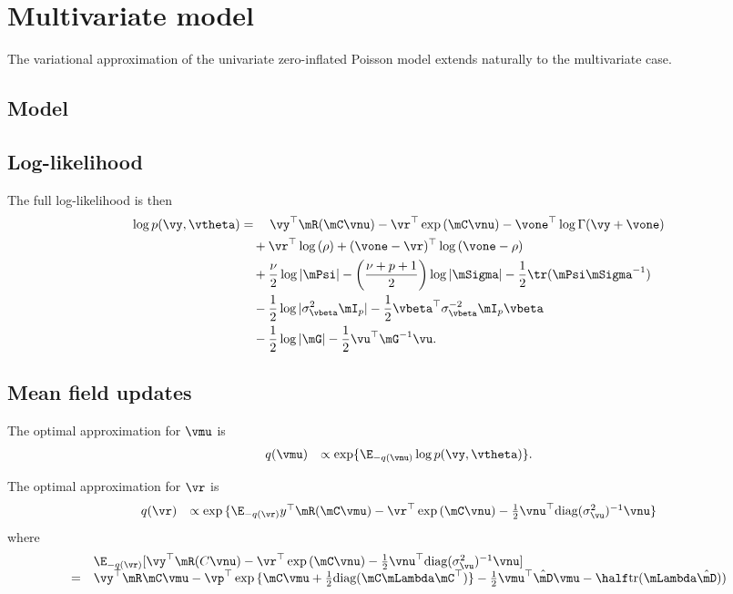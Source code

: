 \section{Multivariate model}

The variational approximation of the univariate zero-inflated Poisson model extends naturally to the
multivariate case.

\subsection{Model}

\subsection{Log-likelihood}
The full log-likelihood is then
\begin{align*}
	\log p(\vy, \vtheta) & = \quad \vy^\top \mR(\mC \vnu) - \vr^\top \exp{(\mC \vnu)} - \vone^\top \log \Gamma(\vy + \vone)                                 \\
	                     & \quad + \vr^\top \log{(\rho)} + (\vone - \vr)^\top \log{(\vone - \rho)}                                                          \\
	                     & \quad + \frac{\nu}{2} \log |\mPsi| - \left( \frac{\nu + p + 1}{2} \right) \log{|\mSigma|} - \frac{1}{2} \tr (\mPsi \mSigma^{-1}) \\
	                     & \quad - \frac{1}{2} \log{|\sigma^2_\vbeta \mI_p|} - \frac{1}{2} \vbeta^\top \sigma_\vbeta^{-2} \mI_p \vbeta                      \\
	                     & \quad - \frac{1}{2} \log |\mG| - \frac{1}{2} \vu^\top \mG^{-1} \vu.                                                                
\end{align*}

\subsection{Mean field updates}
The optimal approximation for $\vmu$ is
\[
	\begin{array}{rl}
		q(\vmu) & \propto \exp \{ \E_{-q(\vnu)} \log p(\vy, \vtheta) \}.
	\end{array}
\]

\noindent The optimal approximation for $\vr$ is
\[
	\begin{array}{rl}
		q(\vr) & \propto \exp{\{\E_{-q(\vr)}y^\top\mR(\mC\vmu) - \vr^\top\exp{(\mC\vnu)}- \frac{1}{2} \vnu^\top \text{diag}(\sigma_{\vu}^2)^{-1} \vnu\}} 
	\end{array}
\]
where
\[
	\begin{array}{rl}
		  & \E_{-q(\vr)} [\vy^\top\mR(C\vnu) - \vr^\top\exp{(\mC\vnu)}- \frac{1}{2} \vnu^\top \text{diag}(\sigma_{\vu}^2)^{-1} \vnu]                                                 \\
		= & \vy^\top\mR\mC \vmu - \vp^\top \exp{\{\mC \vmu +  \frac{1}{2} \text{diag}(\mC \mLambda \mC^\top)\}} -  \frac{1}{2} \vmu^\top \hat{\mD} \vmu - \half \text{tr}(\mLambda \hat{\mD} )) 
	\end{array}
\]

